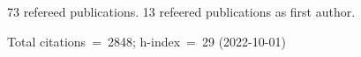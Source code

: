 73 refereed publications. 13 refeered publications as first author.

Total citations~=~2848; h-index~=~29 (2022-10-01)
